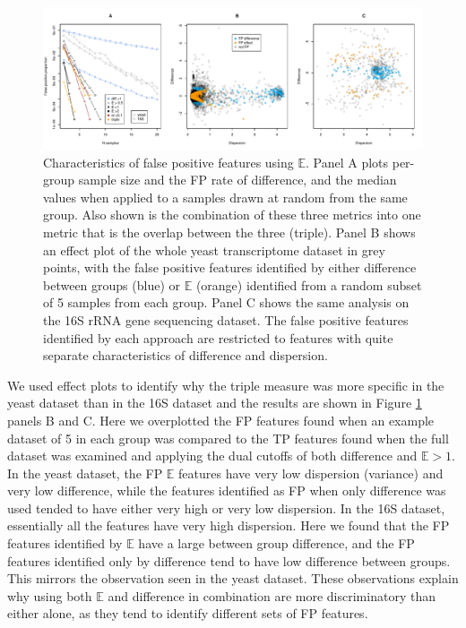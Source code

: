 \documentclass[fleqn,10pt,lineno]{wlpeerj}
\begin{document}
\begin{figure}[tpb]
\centerline{\includegraphics[scale=0.5]{FP-plots.pdf}}
\caption{Characteristics of false positive features using $\mathbb{E}$. Panel A plots per-group sample size and the FP rate of  difference, and the median values when applied to a samples drawn at random from the same group. Also shown is the combination of these three metrics into one metric that is the overlap between the three (triple). Panel B shows an effect plot \citep{gloor:effect} of the whole yeast transcriptome dataset in grey points, with the false positive features identified by either difference between groups (blue) or $\mathbb{E}$ (orange)  identified from a random subset of 5 samples from each group. Panel C shows the same analysis on the 16S rRNA gene sequencing dataset. The false positive features identified by each approach are restricted to features with quite separate characteristics of difference and dispersion.}
\label{fig:fp}
\end{figure}

We used effect plots \citep{gloor:effect} to identify why the triple measure was more specific in the yeast dataset than in the 16S dataset and the results are shown in Figure \ref{fig:fp} panels B and C. Here we overplotted the FP features found when an example dataset of 5 in each group was compared to the TP features found when the full dataset was examined and applying the dual cutoffs of both difference and $\mathbb{E} > 1$.  In the yeast dataset, the FP $\mathbb{E}$ features have very low dispersion (variance) and  very low difference, while the features identified as FP when only difference was used tended to have either very high or very low dispersion. In the 16S dataset, essentially all the features have very high dispersion. Here we found that the FP features identified by  $\mathbb{E}$ have a large between group difference, and the FP features identified only by difference tend to have low difference between groups. This mirrors the observation seen in the yeast dataset. These observations explain why using both $\mathbb{E}$ and difference in combination are  more discriminatory than either alone, as they tend to identify different sets of FP features.
\end{document}
